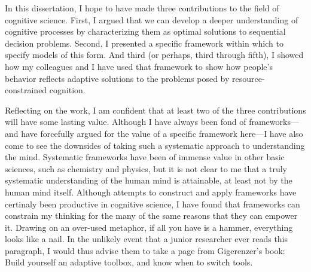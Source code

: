 In this dissertation, I hope to have made three contributions to the field of cognitive science. First, I argued that we can develop a deeper understanding of cognitive processes by characterizing them as optimal solutions to sequential decision problems. Second, I presented a specific framework within which to specify models of this form. And third (or perhaps, third through fifth), I showed how my colleagues and I have used that framework to show how people's behavior reflects adaptive solutions to the problems posed by resource-constrained cognition.

Reflecting on the work, I am confident that at least two of the three contributions will have some lasting value. Although I have always been fond of frameworks---and have forcefully argued for the value of a specific framework here---I have also come to see the downsides of taking such a systematic approach to understanding the mind. Systematic frameworks have been of immense value in other basic sciences, such as chemistry and physics, but it is not clear to me that a truly systematic understanding of the human mind is attainable, at least not by the human mind itself. Although attempts to construct and apply frameworks have certinaly been productive in cognitive science, I have found that frameworks can constrain my thinking for the many of the same reasons that they can empower it. Drawing on an over-used metaphor, if all you have is a hammer, everything looks like a nail. In the unlikely event that a junior researcher ever reads this paragraph, I would thus advise them to take a page from Gigerenzer's book: Build yourself an adaptive toolbox, and know when to switch tools.
